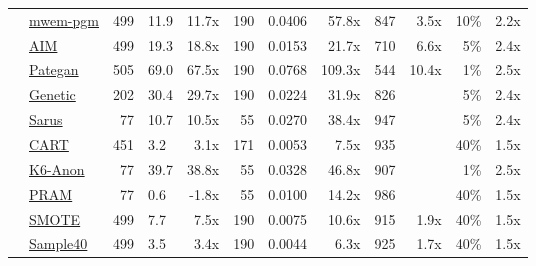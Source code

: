 \begin{table}
\begin{tabular}{llrlr@{\hskip 10pt}r@{\hskip 6pt}l@{\hskip 6pt}r@{\hskip 10pt}r@{\hskip 6pt}r@{\hskip 6pt}r@{\hskip 6pt}r}
        \cellcolor{ForestGreen} & \href{https://htmlpreview.github.io/?https://github.com/yoid2000/sdnist-summary/blob/main/results/mwem_pgm/report.html}{mwem-pgm} & 499 & 11.9 & 11.7x & 190 & 0.0406 & 57.8x & 847 & 3.5x & 10\% & 2.2x \\
        \cellcolor{ForestGreen} & \href{https://htmlpreview.github.io/?https://github.com/yoid2000/sdnist-summary/blob/main/results/aim_e_10_all/report.html}{AIM} & 499 & 19.3 & 18.8x & 190 & 0.0153 & 21.7x & 710 & 6.6x & 5\% & 2.4x \\
        \cellcolor{ForestGreen} & \href{https://htmlpreview.github.io/?https://github.com/yoid2000/sdnist-summary/blob/main/results/pategan_n_iter_50_e_10_all/report.html}{Pategan} & 505 & 69.0 & 67.5x & 190 & 0.0768 & 109.3x & 544 & 10.4x & 1\% & 2.5x \\
        \cellcolor{YellowGreen} & \href{https://htmlpreview.github.io/?https://github.com/yoid2000/sdnist-summary/blob/main/results/genetic_sd_e_10_simple/report.html}{Genetic} & 202 & 30.4 & 29.7x & 190 & 0.0224 & 31.9x & 826 &   & 5\% & 2.4x \\
        \cellcolor{YellowGreen} & \href{https://htmlpreview.github.io/?https://github.com/yoid2000/sdnist-summary/blob/main/results/sarus_sdg_demographic/report.html}{Sarus} & 77 & 10.7 & 10.5x & 55 & 0.0270 & 38.4x & 947 &   & 5\% & 2.4x \\
        \cellcolor{SkyBlue} & \href{https://htmlpreview.github.io/?https://github.com/yoid2000/sdnist-summary/blob/main/results/cart_cf21/report.html}{CART} & 451 & 3.2 & 3.1x & 171 & 0.0053 & 7.5x & 935 &   & 40\% & 1.5x \\
        \cellcolor{pink} & \href{https://htmlpreview.github.io/?https://github.com/yoid2000/sdnist-summary/blob/main/results/k_anonymity_k_6/report.html}{K6-Anon} & 77 & 39.7 & 38.8x & 55 & 0.0328 & 46.8x & 907 &   & 1\% & 2.5x \\
        \cellcolor{Tan} & \href{https://htmlpreview.github.io/?https://github.com/yoid2000/sdnist-summary/blob/main/results/pram_default/report.html}{PRAM} & 77 & 0.6 & -1.8x & 55 & 0.0100 & 14.2x & 986 &   & 40\% & 1.5x \\
        \cellcolor{Sepia} & \href{https://htmlpreview.github.io/?https://github.com/yoid2000/sdnist-summary/blob/main/results/smote_target_marital/report.html}{SMOTE} & 499 & 7.7 & 7.5x & 190 & 0.0075 & 10.6x & 915 & 1.9x & 40\% & 1.5x \\
        \cellcolor{Sepia} & \href{https://htmlpreview.github.io/?https://github.com/yoid2000/sdnist-summary/blob/main/results/subsample_40pcnt_all/report.html}{Sample40} & 499 & 3.5 & 3.4x & 190 & 0.0044 & 6.3x & 925 & 1.7x & 40\% & 1.5x \\
        \bottomrule
    \end{tabular}
\end{table}
